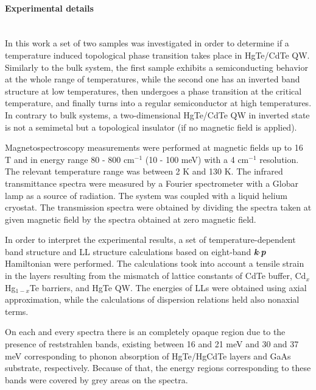\documentclass[titlepage,a4paper]{book}
\newcommand{\wciecie}{\quad\phantom{v}}
\newcommand{\myparagraph}[1]{\paragraph{#1}\mbox{}\\}
\begin{document}
\myparagraph{Experimental details}
\wciecie
In this work a set of two samples was investigated in order to determine if a temperature induced topological phase transition takes place in HgTe/CdTe QW. Similarly to the bulk system, the first sample exhibits a semiconducting behavior at the whole range of temperatures, while the second one has an inverted band structure at low temperatures, then undergoes a phase transition at the critical temperature, and finally turns into a regular semiconductor at high temperatures. In contrary to bulk systems, a two-dimensional HgTe/CdTe QW in inverted state is not a semimetal but a topological insulator (if no magnetic field is applied). 

Magnetospectroscopy measurements were performed at magnetic fields up to 16 T and in energy range 80 - 800 cm$^{-1}$ (10 - 100 meV) with a 4 cm$^{-1}$ resolution. The relevant temperature range was between 2 K and 130 K. The infrared transmittance spectra were measured by a Fourier spectrometer with a Globar lamp as a source of radiation. The system was coupled with a liquid helium cryostat. The transmission spectra were obtained by dividing the spectra taken at given magnetic field by the spectra obtained at zero magnetic field.

In order to interpret the experimental results, a set of temperature-dependent band structure and LL structure calculations based on eight-band \textbf{\textit{k}}$\cdot$\textbf{\textit{p}} Hamiltonian were performed. The calculations took into account a tensile strain in the layers resulting from the mismatch of lattice constants of CdTe buffer, Cd$_{x}$Hg$_{1-x}$Te barriers, and HgTe QW. The energies of LLs were obtained using axial approximation, while the calculations of dispersion relations held also nonaxial terms.

On each and every spectra there is an completely opaque region due to the presence of reststrahlen bands, existing between 16 and 21 meV and 30 and 37 meV corresponding to phonon absorption of HgTe/HgCdTe layers and GaAs substrate, respectively. Because of that, the energy regions corresponding to these bands were covered by grey areas on the spectra.
\end{document}
